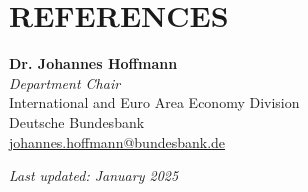 \documentclass[a4paper,9pt]{extarticle}
\begin{document}
\section*{REFERENCES}

\noindent
\begin{minipage}[t]{0.32\textwidth} 
    \textbf{Dr. Johannes Hoffmann} \\
    \textit{Department Chair} \\
    International and Euro Area Economy Division \\
    Deutsche Bundesbank \\
    \href{mailto:johannes.hoffmann@bundesbank.de}{johannes.hoffmann@bundesbank.de} 
\end{minipage}

\vspace{1cm}
\begin{FlushRight}
        \textit{Last updated: January 2025}
\end{FlushRight}



\end{document}
